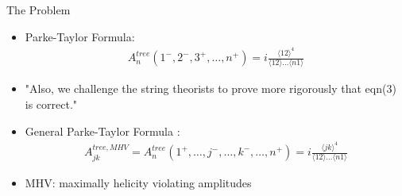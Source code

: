 \documentclass[10pt]{beamer}
\begin{document}
\begin{frame}{The Problem}

\begin{itemize}[<+->]
    \item[] Parke-Taylor Formula:
    \begin{align*}
        A_{n}^{tree}(1^{-}, 2^{-}, 3^{+}, \dots, n^{+}) = i\frac{\langle 12 \rangle^4}{\langle 12 \rangle \dots \langle n1 \rangle}
    \end{align*}

    \item[] "Also, we challenge the string theorists to prove more rigorously that eqn(3) is correct." \cite{pt86}  
    \item[] General Parke-Taylor Formula \cite{bg88recursive}:
    \begin{align*}
        A_{jk}^{tree,MHV} = A_{n}^{tree}(1^{+}, \dots, j^{-}, \dots, k^{-}, \dots, n^{+}) = i\frac{\langle jk \rangle^4}{\langle 12 \rangle \dots \langle n1 \rangle}
    \end{align*}
    \item[] MHV: maximally helicity violating amplitudes
\end{itemize}

\end{frame}
\end{document}
